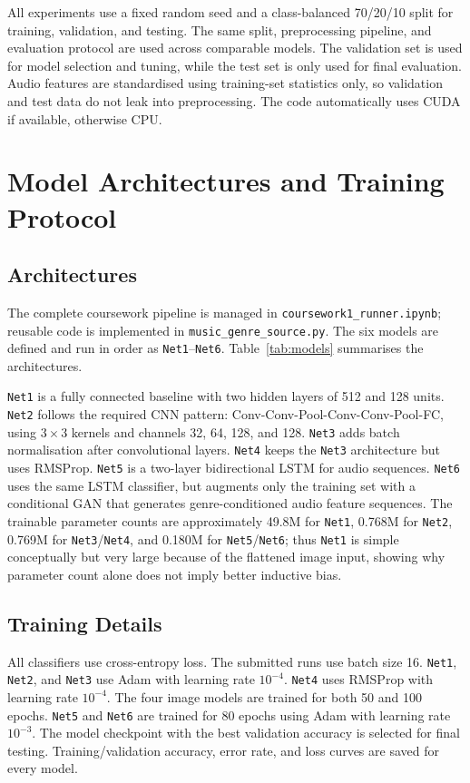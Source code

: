 \documentclass[10pt,twocolumn,letterpaper]{article}
\begin{document}
All experiments use a fixed random seed and a class-balanced 70/20/10 split for training, validation, and testing. The same split, preprocessing pipeline, and evaluation protocol are used across comparable models. The validation set is used for model selection and tuning, while the test set is only used for final evaluation. Audio features are standardised using training-set statistics only, so validation and test data do not leak into preprocessing. The code automatically uses CUDA if available, otherwise CPU.

\section{Model Architectures and Training Protocol}

\subsection{Architectures}

The complete coursework pipeline is managed in \texttt{coursework1\_runner.ipynb}; reusable code is implemented in \texttt{music\_genre\_source.py}. The six models are defined and run in order as \texttt{Net1}--\texttt{Net6}. Table~\ref{tab:models} summarises the architectures.

\texttt{Net1} is a fully connected baseline with two hidden layers of 512 and 128 units. \texttt{Net2} follows the required CNN pattern: Conv-Conv-Pool-Conv-Conv-Pool-FC, using $3\times3$ kernels and channels 32, 64, 128, and 128. \texttt{Net3} adds batch normalisation after convolutional layers. \texttt{Net4} keeps the \texttt{Net3} architecture but uses RMSProp. \texttt{Net5} is a two-layer bidirectional LSTM for audio sequences. \texttt{Net6} uses the same LSTM classifier, but augments only the training set with a conditional GAN that generates genre-conditioned audio feature sequences. The trainable parameter counts are approximately 49.8M for \texttt{Net1}, 0.768M for \texttt{Net2}, 0.769M for \texttt{Net3}/\texttt{Net4}, and 0.180M for \texttt{Net5}/\texttt{Net6}; thus \texttt{Net1} is simple conceptually but very large because of the flattened image input, showing why parameter count alone does not imply better inductive bias.

\subsection{Training Details}

All classifiers use cross-entropy loss. The submitted runs use batch size 16. \texttt{Net1}, \texttt{Net2}, and \texttt{Net3} use Adam with learning rate $10^{-4}$. \texttt{Net4} uses RMSProp with learning rate $10^{-4}$. The four image models are trained for both 50 and 100 epochs. \texttt{Net5} and \texttt{Net6} are trained for 80 epochs using Adam with learning rate $10^{-3}$. The model checkpoint with the best validation accuracy is selected for final testing. Training/validation accuracy, error rate, and loss curves are saved for every model.
\end{document}

